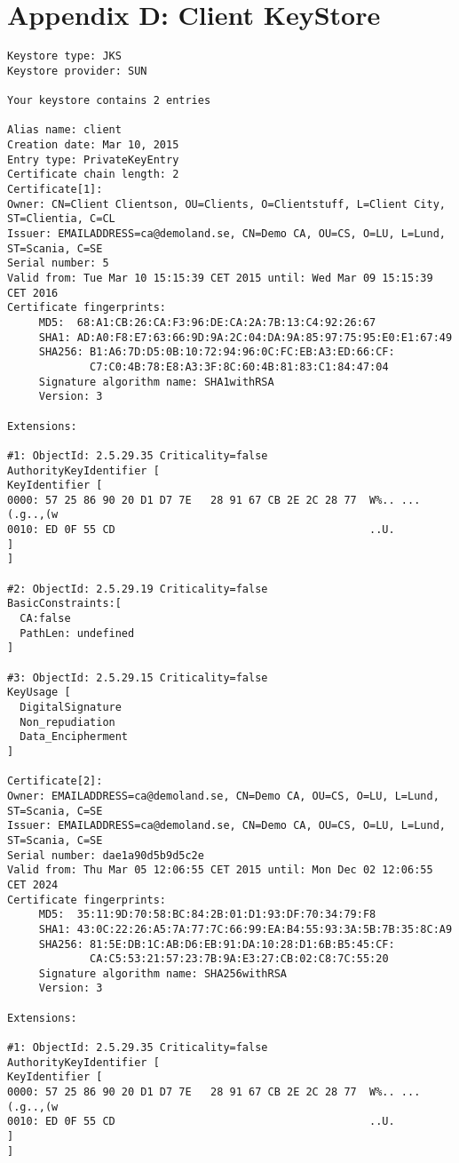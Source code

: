 \documentclass[11pt,a4paper]{article}
\begin{document}
\section{Appendix D: Client KeyStore}
\begin{verbatim}
Keystore type: JKS
Keystore provider: SUN

Your keystore contains 2 entries

Alias name: client
Creation date: Mar 10, 2015
Entry type: PrivateKeyEntry
Certificate chain length: 2
Certificate[1]:
Owner: CN=Client Clientson, OU=Clients, O=Clientstuff, L=Client City, ST=Clientia, C=CL
Issuer: EMAILADDRESS=ca@demoland.se, CN=Demo CA, OU=CS, O=LU, L=Lund, ST=Scania, C=SE
Serial number: 5
Valid from: Tue Mar 10 15:15:39 CET 2015 until: Wed Mar 09 15:15:39 CET 2016
Certificate fingerprints:
	 MD5:  68:A1:CB:26:CA:F3:96:DE:CA:2A:7B:13:C4:92:26:67
	 SHA1: AD:A0:F8:E7:63:66:9D:9A:2C:04:DA:9A:85:97:75:95:E0:E1:67:49
	 SHA256: B1:A6:7D:D5:0B:10:72:94:96:0C:FC:EB:A3:ED:66:CF:
	         C7:C0:4B:78:E8:A3:3F:8C:60:4B:81:83:C1:84:47:04
	 Signature algorithm name: SHA1withRSA
	 Version: 3

Extensions: 

#1: ObjectId: 2.5.29.35 Criticality=false
AuthorityKeyIdentifier [
KeyIdentifier [
0000: 57 25 86 90 20 D1 D7 7E   28 91 67 CB 2E 2C 28 77  W%.. ...(.g..,(w
0010: ED 0F 55 CD                                        ..U.
]
]

#2: ObjectId: 2.5.29.19 Criticality=false
BasicConstraints:[
  CA:false
  PathLen: undefined
]

#3: ObjectId: 2.5.29.15 Criticality=false
KeyUsage [
  DigitalSignature
  Non_repudiation
  Data_Encipherment
]

Certificate[2]:
Owner: EMAILADDRESS=ca@demoland.se, CN=Demo CA, OU=CS, O=LU, L=Lund, ST=Scania, C=SE
Issuer: EMAILADDRESS=ca@demoland.se, CN=Demo CA, OU=CS, O=LU, L=Lund, ST=Scania, C=SE
Serial number: dae1a90d5b9d5c2e
Valid from: Thu Mar 05 12:06:55 CET 2015 until: Mon Dec 02 12:06:55 CET 2024
Certificate fingerprints:
	 MD5:  35:11:9D:70:58:BC:84:2B:01:D1:93:DF:70:34:79:F8
	 SHA1: 43:0C:22:26:A5:7A:77:7C:66:99:EA:B4:55:93:3A:5B:7B:35:8C:A9
	 SHA256: 81:5E:DB:1C:AB:D6:EB:91:DA:10:28:D1:6B:B5:45:CF:
	         CA:C5:53:21:57:23:7B:9A:E3:27:CB:02:C8:7C:55:20
	 Signature algorithm name: SHA256withRSA
	 Version: 3

Extensions: 

#1: ObjectId: 2.5.29.35 Criticality=false
AuthorityKeyIdentifier [
KeyIdentifier [
0000: 57 25 86 90 20 D1 D7 7E   28 91 67 CB 2E 2C 28 77  W%.. ...(.g..,(w
0010: ED 0F 55 CD                                        ..U.
]
]


\end{verbatim}
\end{document}
